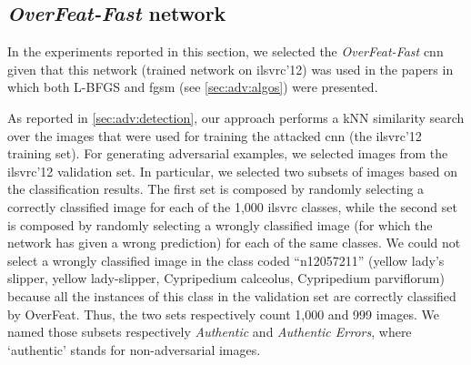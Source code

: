 
\subsection{\emph{OverFeat-Fast} network}
\label{subsec:adv:overfeat}
In the experiments reported in this section, we selected the \emph{OverFeat-Fast} \gls{cnn}~\cite{sermanet2013overfeat} given that this network (trained network on \gls{ilsvrc}'12) was used in the papers in which both L-BFGS and \acrlong{fgsm} (see \ref{sec:adv:algos}) were presented.

As reported in \ref{sec:adv:detection}, our approach performs a kNN similarity search over the images that were used for training the attacked \gls{cnn} (the \gls{ilsvrc}'12 training set).
For generating adversarial examples, we selected images from the \gls{ilsvrc}'12 validation set.
In particular, we selected two subsets of images based on the classification results.
The first set is composed by randomly selecting a correctly classified image for each of the 1,000 \gls{ilsvrc} classes, while the second set is composed by randomly selecting a wrongly classified image (for which the network has given a wrong prediction) for each of the same classes.
We could not select a wrongly classified image in the class coded ``n12057211'' (yellow lady's slipper, yellow lady-slipper, Cypripedium calceolus, Cypripedium parviflorum) because all the instances of this class in the validation set are correctly classified by OverFeat.
Thus, the two sets respectively count 1,000 and 999 images.
We named those subsets respectively \emph{Authentic} and \emph{Authentic Errors}, where `authentic' stands for non-adversarial images.

